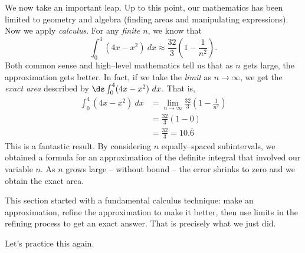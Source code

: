 We now take an important leap. Up to this point, our mathematics has been limited to geometry and algebra (finding areas and manipulating expressions). Now we apply \textit{calculus}. For any \textit{finite} $n$, we know that
$$\int_0^4 (4x-x^2)\ dx \approx \frac{32}{3}\left(1-\frac{1}{n^2}\right).$$
Both common sense and high--level mathematics tell us that as $n$ gets large, the approximation gets better. In fact, if we take the \textit{limit} as $n\rightarrow \infty$, we get the \textit{exact area} described by $\ds\int_0^4 (4x-x^2)\ dx$. That is, 
\begin{align*}
	\int_0^4 (4x-x^2)\ dx
	&= \lim_{n\to\infty} \frac{32}{3}\left(1-\frac{1}{n^2}\right) \\
	&= \frac{32}{3}\left(1-0\right)\\
	&= \frac{32}{3} = 10.\overline{6}
\end{align*}
This is a fantastic result. By considering $n$ equally--spaced subintervals, we obtained a formula for an approximation of the definite integral that involved our variable $n$. As $n$ grows large -- without bound -- the error shrinks to zero and we obtain the exact area.

This section started with a fundamental calculus technique: make an approximation, refine the approximation to make it better, then use limits in the refining process to get an exact answer. That is precisely what we just did.

Let's practice this again.


